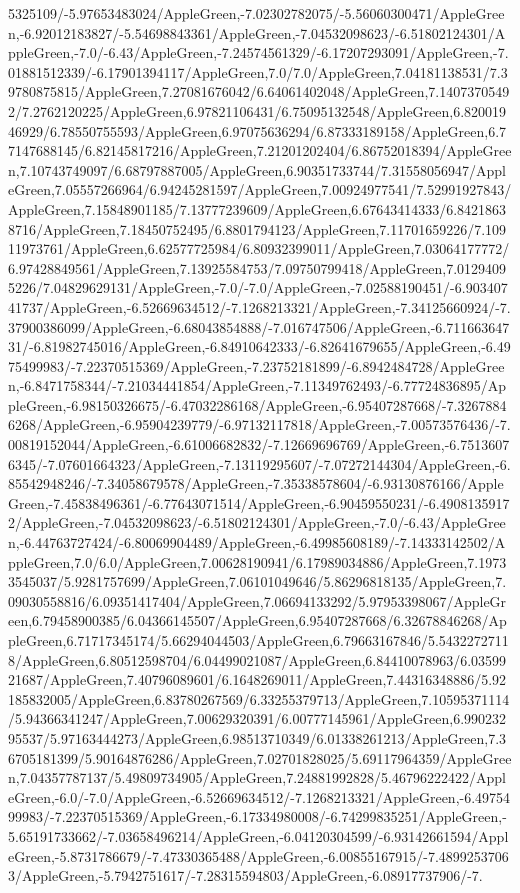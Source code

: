 {\begin{tikzternal}
5325109/-5.97653483024/AppleGreen,-7.02302782075/-5.56060300471/AppleGreen,-6.92012183827/-5.54698843361/AppleGreen,-7.04532098623/-6.51802124301/AppleGreen,-7.0/-6.43/AppleGreen,-7.24574561329/-6.17207293091/AppleGreen,-7.01881512339/-6.17901394117/AppleGreen,7.0/7.0/AppleGreen,7.04181138531/7.39780875815/AppleGreen,7.27081676042/6.64061402048/AppleGreen,7.14073705492/7.2762120225/AppleGreen,6.97821106431/6.75095132548/AppleGreen,6.82001946929/6.78550755593/AppleGreen,6.97075636294/6.87333189158/AppleGreen,6.77147688145/6.82145817216/AppleGreen,7.21201202404/6.86752018394/AppleGreen,7.10743749097/6.68797887005/AppleGreen,6.90351733744/7.31558056947/AppleGreen,7.05557266964/6.94245281597/AppleGreen,7.00924977541/7.52991927843/AppleGreen,7.15848901185/7.13777239609/AppleGreen,6.67643414333/6.84218638716/AppleGreen,7.18450752495/6.8801794123/AppleGreen,7.11701659226/7.10911973761/AppleGreen,6.62577725984/6.80932399011/AppleGreen,7.03064177772/6.97428849561/AppleGreen,7.13925584753/7.09750799418/AppleGreen,7.01294095226/7.04829629131/AppleGreen,-7.0/-7.0/AppleGreen,-7.02588190451/-6.90340741737/AppleGreen,-6.52669634512/-7.1268213321/AppleGreen,-7.34125660924/-7.37900386099/AppleGreen,-6.68043854888/-7.016747506/AppleGreen,-6.71166364731/-6.81982745016/AppleGreen,-6.84910642333/-6.82641679655/AppleGreen,-6.4975499983/-7.22370515369/AppleGreen,-7.23752181899/-6.8942484728/AppleGreen,-6.8471758344/-7.21034441854/AppleGreen,-7.11349762493/-6.77724836895/AppleGreen,-6.98150326675/-6.47032286168/AppleGreen,-6.95407287668/-7.32678846268/AppleGreen,-6.95904239779/-6.97132117818/AppleGreen,-7.00573576436/-7.00819152044/AppleGreen,-6.61006682832/-7.12669696769/AppleGreen,-6.75136076345/-7.07601664323/AppleGreen,-7.13119295607/-7.07272144304/AppleGreen,-6.85542948246/-7.34058679578/AppleGreen,-7.35338578604/-6.93130876166/AppleGreen,-7.45838496361/-6.77643071514/AppleGreen,-6.90459550231/-6.49081359172/AppleGreen,-7.04532098623/-6.51802124301/AppleGreen,-7.0/-6.43/AppleGreen,-6.44763727424/-6.80069904489/AppleGreen,-6.49985608189/-7.14333142502/AppleGreen,7.0/6.0/AppleGreen,7.00628190941/6.17989034886/AppleGreen,7.19733545037/5.9281757699/AppleGreen,7.06101049646/5.86296818135/AppleGreen,7.09030558816/6.09351417404/AppleGreen,7.06694133292/5.97953398067/AppleGreen,6.79458900385/6.04366145507/AppleGreen,6.95407287668/6.32678846268/AppleGreen,6.71717345174/5.66294044503/AppleGreen,6.79663167846/5.54322727118/AppleGreen,6.80512598704/6.04499021087/AppleGreen,6.84410078963/6.0359921687/AppleGreen,7.40796089601/6.1648269011/AppleGreen,7.44316348886/5.92185832005/AppleGreen,6.83780267569/6.33255379713/AppleGreen,7.10595371114/5.94366341247/AppleGreen,7.00629320391/6.00777145961/AppleGreen,6.99023295537/5.97163444273/AppleGreen,6.98513710349/6.01338261213/AppleGreen,7.36705181399/5.90164876286/AppleGreen,7.02701828025/5.69117964359/AppleGreen,7.04357787137/5.49809734905/AppleGreen,7.24881992828/5.46796222422/AppleGreen,-6.0/-7.0/AppleGreen,-6.52669634512/-7.1268213321/AppleGreen,-6.4975499983/-7.22370515369/AppleGreen,-6.17334980008/-6.74299835251/AppleGreen,-5.65191733662/-7.03658496214/AppleGreen,-6.04120304599/-6.93142661594/AppleGreen,-5.8731786679/-7.47330365488/AppleGreen,-6.00855167915/-7.48992537063/AppleGreen,-5.7942751617/-7.28315594803/AppleGreen,-6.08917737906/-7.
\end{tikzternal}}
